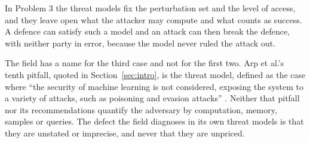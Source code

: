 In Problem 3 the threat models fix the perturbation set and the level of access,
and they leave open what the attacker may compute and what counts as success. A
defence can satisfy such a model and an attack can then break the defence, with
neither party in error, because the model never ruled the attack out.

The field has a name for the third case and not for the first two. Arp et al.'s
tenth pitfall, quoted in Section~\ref{sec:intro}, is the threat model, defined as
the case where ``the security of machine learning is not considered, exposing the
system to a variety of attacks, such as poisoning and evasion attacks''
\cite{AQPWPWCR22}. Neither that pitfall nor its recommendations quantify the
adversary by computation, memory, samples or queries. The defect the field
diagnoses in its own threat models is that they are unstated or imprecise, and
never that they are unpriced.
